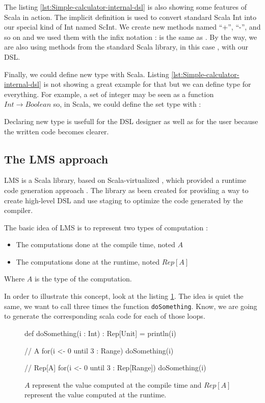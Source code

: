 The listing \ref{lst:Simple-calculator-internal-dsl} is also showing some
features of Scala in action. The implicit definition  is used to
convert standard Scala Int into our special kind of Int named ScInt. We create
new methods named ``+'', ``-'', and so on and we used them with the infix
notation :  is the same as . By the way,
we are also using methods from the standard Scala library, in this case
, with our \gls{DSL}.

Finally, we could define new type with Scala. Listing
\ref{lst:Simple-calculator-internal-dsl} is not showing a great example for that
but we can define type for everything. For example, a set of integer may be seen
as a function $Int \rightarrow Boolean$ so, in Scala, we could define the set
type with :


Declaring new type is usefull for the \gls{DSL} designer as well as for the user
because the written code becomes clearer.

\subsection{The LMS approach}
\label{subsec:lms_approach}

\gls{LMS} is a Scala library, based on Scala-virtualized \cite{Rompf2012}, which
provided a runtime code generation approach
\cite{Rompf:2010:LMS:1942788.1868314}. The library as been created for providing
a way to create high-level \gls{DSL} and use staging to optimize the code
generated by the compiler.

The basic idea of \gls{LMS} is to represent two types of computation :
\begin{itemize}
\item The computations done at the compile time, noted $A$
\item The computations done at the runtime, noted $Rep[A]$
\end{itemize}

Where $A$ is the type of the computation.

In order to illustrate this concept, look at the listing \ref{lst:lms-example}.
The idea is quiet the same, we want to call three times the function
{\normalsize \verb|doSomething|}. Know, we are going to generate the
corresponding scala code for each of those loops.

\begin{figure}[ht]
  \centering
\begin{scalacode}
def doSomething(i : Int) : Rep[Unit] = {
  println(i)
}

// A
for(i <- 0 until 3 : Range) {
  doSomething(i)
}

// Rep[A]
for(i <- 0 until 3 : Rep[Range]) {
  doSomething(i)
}
\end{scalacode}
  \caption[Difference between \(A\) and \(Rep\lbrack A\rbrack\) in a code example]{$A$ represent
    the value computed at the compile time and $Rep[A]$ represent the value
    computed at the runtime.}
  \label{lst:lms-example}
\end{figure}

